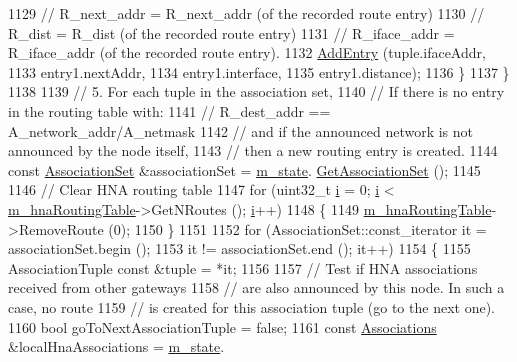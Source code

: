 \begin{DoxyCode}
1129           \textcolor{comment}{//       R\_next\_addr  =  R\_next\_addr  (of the recorded route entry)}
1130           \textcolor{comment}{//       R\_dist       =  R\_dist       (of the recorded route entry)}
1131           \textcolor{comment}{//       R\_iface\_addr =  R\_iface\_addr (of the recorded route entry).}
1132           \hyperlink{classns3_1_1olsr_1_1RoutingProtocol_a6ddb7dd3a6584b7d88dc5a41a61b1494}{AddEntry} (tuple.ifaceAddr,
1133                     entry1.nextAddr,
1134                     entry1.interface,
1135                     entry1.distance);
1136         \}
1137     \}
1138 
1139   \textcolor{comment}{// 5. For each tuple in the association set,}
1140   \textcolor{comment}{//    If there is no entry in the routing table with:}
1141   \textcolor{comment}{//        R\_dest\_addr     == A\_network\_addr/A\_netmask}
1142   \textcolor{comment}{//   and if the announced network is not announced by the node itself,}
1143   \textcolor{comment}{//   then a new routing entry is created.}
1144   \textcolor{keyword}{const} \hyperlink{namespacens3_1_1olsr_a35c0d7e5a941dd49e212f0c9e81ba466}{AssociationSet} &associationSet = \hyperlink{classns3_1_1olsr_1_1RoutingProtocol_a07942ec1a7df71b609c8d2ff3b567c49}{m\_state}.
      \hyperlink{classns3_1_1olsr_1_1OlsrState_acfc3b69f5b2a730cfe5501f757ec7c80}{GetAssociationSet} ();
1145 
1146   \textcolor{comment}{// Clear HNA routing table}
1147   \textcolor{keywordflow}{for} (uint32\_t \hyperlink{bernuolliDistribution_8m_a6f6ccfcf58b31cb6412107d9d5281426}{i} = 0; \hyperlink{bernuolliDistribution_8m_a6f6ccfcf58b31cb6412107d9d5281426}{i} < \hyperlink{classns3_1_1olsr_1_1RoutingProtocol_a398799911ae136e0b247b4bbd608c336}{m\_hnaRoutingTable}->GetNRoutes (); 
      \hyperlink{bernuolliDistribution_8m_a6f6ccfcf58b31cb6412107d9d5281426}{i}++)
1148     \{
1149       \hyperlink{classns3_1_1olsr_1_1RoutingProtocol_a398799911ae136e0b247b4bbd608c336}{m\_hnaRoutingTable}->RemoveRoute (0);
1150     \}
1151 
1152   \textcolor{keywordflow}{for} (AssociationSet::const\_iterator it = associationSet.begin ();
1153        it != associationSet.end (); it++)
1154     \{
1155       AssociationTuple \textcolor{keyword}{const} &tuple = *it;
1156 
1157       \textcolor{comment}{// Test if HNA associations received from other gateways}
1158       \textcolor{comment}{// are also announced by this node. In such a case, no route}
1159       \textcolor{comment}{// is created for this association tuple (go to the next one).}
1160       \textcolor{keywordtype}{bool} goToNextAssociationTuple = \textcolor{keyword}{false};
1161       \textcolor{keyword}{const} \hyperlink{namespacens3_1_1olsr_a7aefab4ffae5b289262125647510a2ef}{Associations} &localHnaAssociations = \hyperlink{classns3_1_1olsr_1_1RoutingProtocol_a07942ec1a7df71b609c8d2ff3b567c49}{m\_state}.

\end{DoxyCode}
